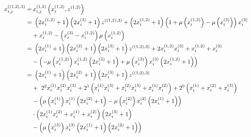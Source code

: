 \begin{alignat}{3}
	x_{i,j}^{\left(\left(1,2\right),3\right)} =& \, x_{i,j}^{\left(1,2\right)}\left(x_{i}^{\left(1,2\right)},z^{\left(1,2\right)}\right) \notag \\
	=& \ \left(2x_{i}^{\left(1,2\right)} + 1\right)\left(2x_{i}^{\left(3\right)} + 1\right)z^{\left(\left(1,2\right),3\right)}
	+ \left(2x_{i}^{\left(1,2\right)} + 1\right)\left(1 + \mu\left(x_{i}^{\left(1,2\right)}\right) - \mu\left(x_{i}^{\left(3\right)}\right)\right)x_{i}^{\left(3\right)} \notag \\  
	&+ x_{i}^{\left(1,2\right)} - \left(x_{i}^{\left(3\right)} - x_{i}^{\left(1,2\right)}\right)\mu\left(x_{i}^{\left(1,2\right)}\right) \notag \\
	=& \ \left(2x_{i}^{\left(1\right)} + 1\right)\left(2x_{i}^{\left(2\right)} + 1\right)\left(2x_{i}^{\left(3\right)} + 1\right)z^{\left(\left(1,2\right),3\right)}
	+ 2x_{i}^{\left(1,2\right)}x_{i}^{\left(3\right)} + x_{i}^{\left(1,2\right)} + x_{i}^{\left(3\right)} \notag \\
	&- \left(-\mu\left(x_{i}^{\left(1,2\right)}\right)x_{i}^{\left(1,2\right)}\left(2x_{i}^{\left(3\right)} + 1\right)
	+ \mu\left(x_{i}^{\left(3\right)}\right)x_{i}^{\left(3\right)}\left(2x_{i}^{\left(1,2\right)} + 1\right)\right) \notag \\
	=& \ \left(2x_{i}^{\left(1\right)} + 1\right)\left(2x_{i}^{\left(2\right)} + 1\right)\left(2x_{i}^{\left(3\right)} + 1\right)z^{\left(\left(1,2\right),3\right)} \notag \\
	&+ \ 2^{2}x_{i}^{\left(1\right)}x_{i}^{\left(2\right)}x_{i}^{\left(3\right)} + 2^{1}\left(x_{i}^{\left(1\right)}x_{i}^{\left(3\right)} + x_{i}^{\left(2\right)}x_{i}^{\left(3\right)} + x_{i}^{\left(1\right)}x_{i}^{\left(2\right)}\right) + 2^{0}\left(x_{i}^{\left(1\right)} + x_{i}^{\left(2\right)} + x_{i}^{\left(3\right)}\right) \notag \\
	&- \left(\mu\left(x_{i}^{\left(1\right)}\right)x_{i}^{\left(1\right)}\left(2x_{i}^{\left(2\right)} + 1\right)
	- \mu\left(x_{i}^{\left(2\right)}\right)x_{i}^{\left(2\right)}\left(2x_{i}^{\left(1\right)} + 1\right)\right) \notag \\
	&\cdot \left(2x_{i}^{\left(1\right)}x_{i}^{\left(2\right)} + x_{i}^{\left(1\right)} + x_{i}^{\left(2\right)}\right)\left(2x_{i}^{\left(3\right)} + 1\right) \notag \\
	&- \left(\mu\left(x_{i}^{\left(3\right)}\right)x_{i}^{\left(3\right)}\left(2x_{i}^{\left(1\right)} + 1\right)\left(2x_{i}^{\left(2\right)} + 1\right)\right) \notag \\

\end{alignat}
